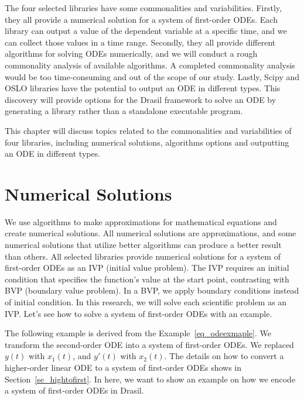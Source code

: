 The four selected libraries have some commonalities and variabilities. Firstly, they all provide a numerical solution for a system of first-order ODEs. Each library can output a value of the dependent variable at a specific time, and we can collect those values in a time range. Secondly, they all provide different algorithms for solving ODEs numerically, and we will conduct a rough commonality analysis of available algorithms. A completed commonality analysis would be too time-consuming and out of the scope of our study. Lastly, Scipy and OSLO libraries have the potential to output an ODE in different types. This discovery will provide options for the Drasil framework to solve an ODE by generating a library rather than a standalone executable program. 


This chapter will discuss topics related to the commonalities and variabilities of four libraries, including numerical solutions, algorithms options and outputting an ODE in different types. 


\section{Numerical Solutions}
We use algorithms to make approximations for mathematical equations and create numerical solutions. All numerical solutions are approximations, and some numerical solutions that utilize better algorithms can produce a better result than others. All selected libraries provide numerical solutions for a system of first-order ODEs as an IVP (initial value problem). The IVP requires an initial condition that specifies the function's value at the start point, contrasting with BVP (boundary value problem). In a BVP, we apply boundary conditions instead of initial condition. In this research, we will solve each scientific problem as an IVP. Let's see how to solve a system of first-order ODEs with an example. 

The following example is derived from the Example~\ref{eq_odeexmaple}. We transform the second-order ODE into a system of first-order ODEs. We replaced $y(t)$ with $x_{1}(t)$, and $y'(t)$ with $x_{2}(t)$. The details on how to convert a higher-order linear ODE to a system of first-order ODEs shows in Section~\ref{se_hightofirst}. In here, we want to show an example on how we encode a system of first-order ODEs in Drasil.

